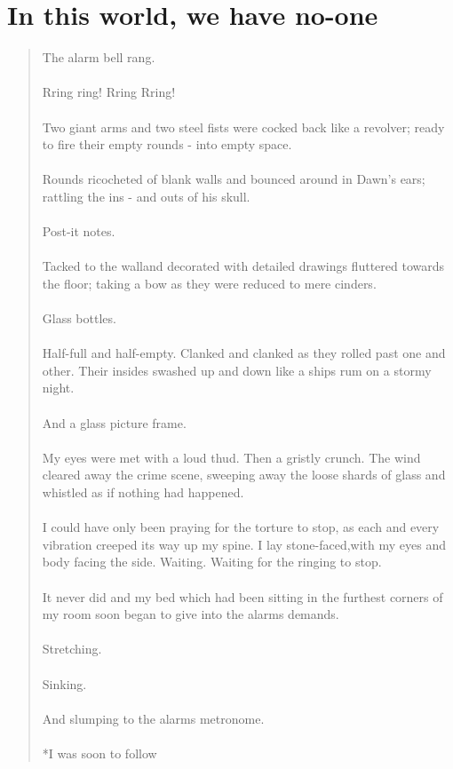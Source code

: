 \documentclass{book}
\begin{document}
\chapter{In this world, we have no-one}
\begin{quote}
The alarm bell rang.\\\\
Rring ring! Rring Rring!\\\\
Two giant arms and two steel fists were cocked back like a revolver; ready to fire their empty rounds - into empty space.\\\\
Rounds ricocheted of blank walls and bounced around in Dawn's ears; rattling the ins - and outs of his skull.\\\\
Post-it notes.\\\\ Tacked to the walland decorated with detailed drawings fluttered towards the floor; taking a bow as they were reduced to mere cinders.\\\\ Glass bottles.\\\\
Half-full and half-empty. Clanked and clanked as they rolled  past one and other. Their insides swashed up and down like a ships rum on a stormy night.\\\\
And a glass picture frame.\\\\
My eyes were met with a loud thud. Then a gristly crunch. The wind cleared away the crime scene, sweeping away the loose shards of glass and whistled as if nothing had happened.\\\\
I could have only been praying for the torture to stop, as each and every vibration creeped its way up my spine. I lay stone-faced,with my eyes and body facing the side. Waiting. Waiting for the ringing to stop.\\\\
It never did and my bed which had been sitting in the furthest corners of my room soon began to give into the alarms demands.\\\\
Stretching.\\\\
Sinking.\\\\ And slumping to the alarms metronome.
\\\\ *I was soon to follow
 \end{quote}
\end{document}
